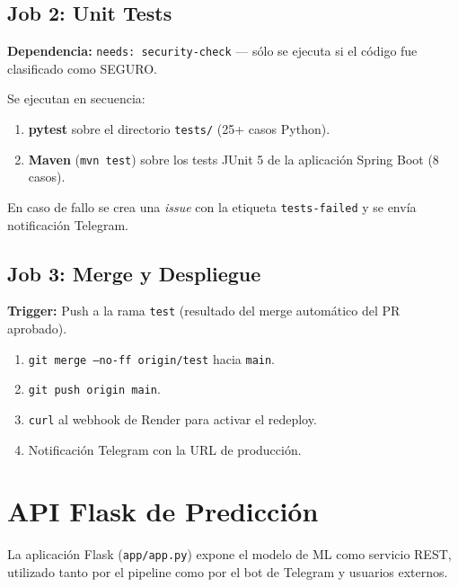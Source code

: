 \documentclass[12pt,a4paper]{article}
\begin{document}
\subsection{Job 2: Unit Tests}

\textbf{Dependencia:} \texttt{needs: security-check} — sólo se ejecuta si el código fue clasificado como SEGURO.

Se ejecutan en secuencia:
\begin{enumerate}
  \item \textbf{pytest} sobre el directorio \texttt{tests/} (25+ casos Python).
  \item \textbf{Maven} (\texttt{mvn test}) sobre los tests JUnit 5 de la aplicación Spring Boot (8 casos).
\end{enumerate}

En caso de fallo se crea una \textit{issue} con la etiqueta \texttt{tests-failed} y se envía notificación Telegram.

\subsection{Job 3: Merge y Despliegue}

\textbf{Trigger:} Push a la rama \texttt{test} (resultado del merge automático del PR aprobado).

\begin{enumerate}
  \item \texttt{git merge --no-ff origin/test} hacia \texttt{main}.
  \item \texttt{git push origin main}.
  \item \texttt{curl} al webhook de Render para activar el redeploy.
  \item Notificación Telegram con la URL de producción.
\end{enumerate}

\section{API Flask de Predicción}

La aplicación Flask (\texttt{app/app.py}) expone el modelo de ML como servicio REST, utilizado tanto por el pipeline como por el bot de Telegram y usuarios externos.
\end{document}
